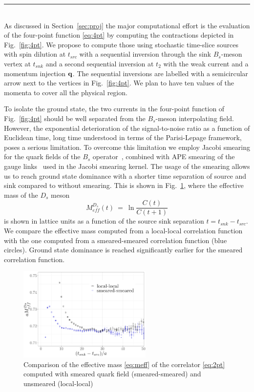 \label{sec:algos}
\rule{\textwidth}{0.4pt}\\

As discussed in Section~\ref{sec:proj} the major computational effort is 
the evaluation of the four-point function \eqref{eq:4pt} by computing the
contractions depicted in Fig.~\ref{fig:4pt}.
We propose to compute those using stochastic time-slice sources with
spin dilution at $t_{src}$ with a sequential inversion through the
sink $B_s$-meson vertex at $t_{snk}$ and a second sequential inversion
at $t_2$ with the weak current and a momentum injection ${\bf q}$.
The sequential inversions are labelled with a semicircular arrow next to
the vertices in Fig.~\ref{fig:4pt}. We plan to have ten values of the
momenta to cover all the physical region.

To isolate the ground state, the two currents in the
four-point function of Fig.~\ref{fig:4pt} should be well separated
from the $B_s$-meson interpolating field. However, the exponential
deterioration of the signal-to-noise ratio as a function of Euclidean
time, long time understood in terms of the Parisi-Lepage framework,
poses a serious limitation. To overcome this limitation we employ
Jacobi smearing for the quark fields of the $B_s$
operator~\cite{Allton:1993wc}, combined with APE smearing of the gauge
links~\cite{FALCIONI1985624} used in the Jacobi smearing kernel.  
The usage of the smearing allows us to reach ground state dominance 
with a shorter time separation of source and sink compared to without
smearing. This is shown in Fig.~\ref{fig:smearing}, where the
effective mass of the $D_s$ meson
\begin{equation}\label{eq:meff}
	M_{eff}^{D_s}(t)\ =\ \ln\frac{C(t)}{C(t+1)}	
\end{equation}
is shown in lattice units as a function of the source sink separation
$t=t_{snk}-t_{src}$. We compare the effective mass 
computed from a local-local correlation function with the one computed from
a smeared-smeared correlation function (blue circles). Ground state
dominance is reached significantly earlier for the smeared correlation
function. 
             
\begin{figure}
  \includegraphics[width=0.59\textwidth]{plots/smearing_MDs.pdf}
  \caption{Comparison of the effective mass \eqref{eq:meff} of the correlator
    \eqref{eq:2pt}  computed with
    smeared quark field (smeared-smeared) and unsmeared (local-local)} 
  \label{fig:smearing}
\end{figure}


